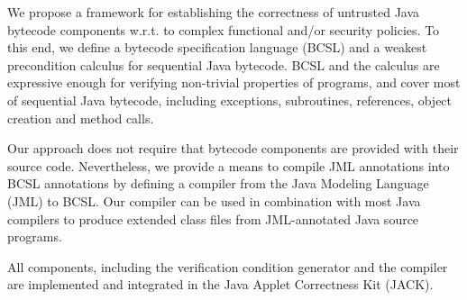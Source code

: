 
We propose a framework for establishing the correctness of untrusted
Java bytecode components w.r.t. to complex functional and/or security
policies. To this end, we define a bytecode specification language
(BCSL) and a weakest precondition calculus for sequential Java
bytecode. BCSL and the calculus are expressive enough for verifying
non-trivial properties of programs, and cover most of sequential Java
bytecode, including exceptions, subroutines, references, object
creation and method calls.

Our approach does not require that bytecode components are provided
with their source code. Nevertheless, we provide a means to
compile JML annotations into BCSL annotations %
by defining a compiler from the Java Modeling Language (JML) to BCSL.
Our compiler can be used in combination with most Java compilers to
produce extended class files from JML-annotated Java source programs.

All components, including the verification condition generator and the
compiler are implemented and integrated in the Java Applet Correctness
Kit (JACK).
